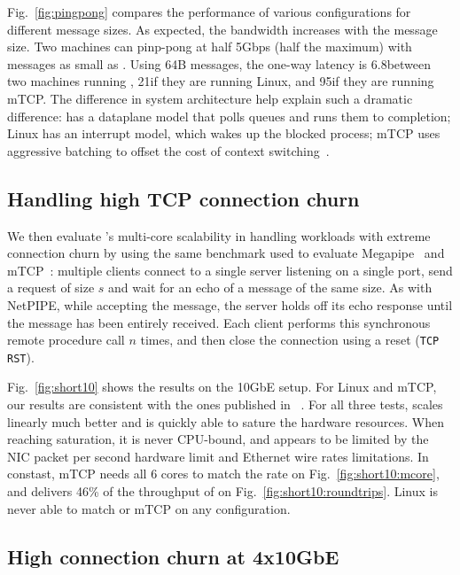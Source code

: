 \edb Fig.~\ref{fig:pingpong} compares the performance of various
configurations for different message sizes.  As expected, the
bandwidth increases with the message size. Two \ix machines can
pinp-pong at half 5Gbps (half the maximum) with messages as small as
.  Using 64B messages, the one-way latency is 
6.8\microsecond between two machines running \ix, 21\microsecond if
they are running Linux, and 95\microsecond if they are running mTCP.
The difference in system architecture help explain such a dramatic
difference: \ix has a dataplane model that polls queues and runs them
to completion; Linux has an interrupt model, which wakes up the
blocked process; mTCP uses aggressive batching to offset the cost of context switching~\cite{jeong2014mtcp}.

\subsection{Handling high TCP connection churn}
\label{sec:eval:short}


We then evaluate \ix's multi-core scalability in handling workloads
with extreme connection churn by using the same benchmark used to evaluate
Megapipe~\cite{han2012megapipe} and mTCP~\cite{jeong2014mtcp}:
multiple clients connect to a single server listening on a single
port, send a request of size $s$ and wait for an echo of a message of
the same size.  As with NetPIPE, while accepting the message, the server holds off its
echo response until the message has been entirely received.
Each client performs this synchronous remote procedure
call $n$ times, and then close the connection using a reset
(\texttt{TCP RST}).



Fig.~\ref{fig:short10} shows the results on the 10GbE setup.  For
Linux and mTCP, our results are consistent with the ones published in
~\cite{jeong2014mtcp}.  For all three tests, \ix scales linearly much better
and is quickly able to sature the hardware resources.  When reaching
saturation, it is never CPU-bound, and appears to be limited by the
NIC packet per second hardware limit and Ethernet wire rates
limitations.  In constast, mTCP needs all 6 cores to match the rate on
Fig.~\ref{fig:short10:mcore}, and delivers 46\% of the throughput of
\ix on Fig.~\ref{fig:short10:roundtrips}.  Linux is never able to
match \ix or mTCP on any configuration.


\subsection{High connection churn at 4x10GbE}
\label{sec:eval:short40}

